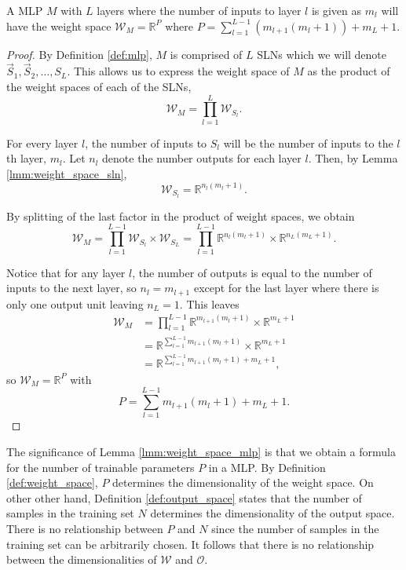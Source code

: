 \begin{lemma}
    \label{lmm:weight_space_mlp}
    A MLP $M$ with $L$ layers where the number of inputs to layer $l$ is given as $m_l$ will have the weight space $\mathcal{W}_M = \mathbb{R}^P$ where
    $P = \sum_{l=1}^{L-1}{\left(m_{l+1} (m_l + 1)\right)} + m_L + 1$.
\end{lemma}

\begin{proof}
    By Definition \ref{def:mlp}, $M$ is comprised of $L$ SLNs which we will denote $\vec{S}_1, \vec{S}_2, \dots, S_L$.
    This allows us to express the weight space of $M$ as the product of the weight spaces of each of the SLNs,
    $$
        \mathcal{W}_M
        = \prod_{l=1}^L{\mathcal{W}_{S_l}}.
    $$

    For every layer $l$, the number of inputs to $S_l$ will be the number of inputs to the $l$th layer, $m_l$. 
    Let $n_l$ denote the number outputs for each layer $l$.
    Then, by Lemma \ref{lmm:weight_space_sln},
    $$\mathcal{W}_{S_l} = \mathbb{R}^{n_l(m_l+1)}.$$
    
    By splitting of the last factor in the product of weight spaces, we obtain 
    \begin{equation*}
        \mathcal{W}_M
        = \prod_{l=1}^{L-1}{\mathcal{W}_{S_l}} \times \mathcal{W}_{S_L}
        = \prod_{l=1}^{L-1}{\mathbb{R}^{n_l(m_l+1)}} \times \mathbb{R}^{n_L(m_L+1)}.
    \end{equation*}

    Notice that for any layer $l$, the number of outputs is equal to the number of inputs to the next layer, so $n_l=m_{l+1}$ except for the last layer where there is only one output unit leaving $n_L=1$.
    This leaves
    \begin{align*}
        \mathcal{W}_M
        &= \prod_{l=1}^{L-1}{\mathbb{R}^{m_{l+1}(m_l+1)}} \times \mathbb{R}^{m_L+1} \\
        &= \mathbb{R}^{\sum_{l=1}^{L-1}{m_{l+1}(m_l+1)}} \times \mathbb{R}^{m_L+1} \\
        &= \mathbb{R}^{\sum_{l=1}^{L-1}{m_{l+1}(m_l+1)} + m_L+1},
    \end{align*}
    so $\mathcal{W}_M = \mathbb{R}^P$ with
    \begin{equation*}
        P = \sum_{l=1}^{L-1}{m_{l+1}(m_l+1)} + m_L+1.
    \end{equation*}
\end{proof}

\begin{remark}
    The significance of Lemma \ref{lmm:weight_space_mlp} is that we obtain a formula for the number of trainable parameters $P$ in a MLP. 
    By Definition \ref{def:weight_space}, $P$ determines the dimensionality of the weight space. 
    On other other hand, Definition \ref{def:output_space} states that the number of samples in the training set $N$ determines the dimensionality of the output space.
    There is no relationship between $P$ and $N$ since the number of samples in the training set can be arbitrarily chosen. 
    It follows that there is no relationship between the dimensionalities of $\mathcal{W}$ and $\mathcal{O}$.
\end{remark}


